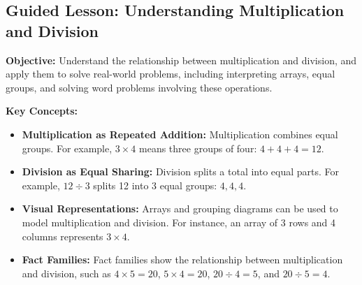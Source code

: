 \documentclass[12pt]{article}
\title{}
\date{}
\begin{document}
\subsection*{Guided Lesson: Understanding Multiplication and Division}
\onehalfspacing

\begin{tcolorbox}[colframe=black!40, colback=gray!5, 
coltitle=black, colbacktitle=black!20, fonttitle=\bfseries\Large, 
title=Learning Objective, halign title=center, left=5pt, right=5pt, top=5pt, bottom=15pt]
\textbf{Objective:} Understand the relationship between multiplication and division, and apply them to solve real-world problems, including interpreting arrays, equal groups, and solving word problems involving these operations.
\end{tcolorbox}

\vspace{1em}

\begin{tcolorbox}[colframe=black!60, colback=white, 
coltitle=black, colbacktitle=black!15, fonttitle=\bfseries\Large, 
title=Key Concepts and Vocabulary, halign title=center, left=10pt, right=10pt, top=10pt, bottom=15pt]
\textbf{Key Concepts:}
\begin{itemize}
    \item \textbf{Multiplication as Repeated Addition:} Multiplication combines equal groups. For example, \( 3 \times 4 \) means three groups of four: \( 4 + 4 + 4 = 12 \).
    \item \textbf{Division as Equal Sharing:} Division splits a total into equal parts. For example, \( 12 \div 3 \) splits 12 into 3 equal groups: \( 4, 4, 4 \).
    \item \textbf{Visual Representations:} Arrays and grouping diagrams can be used to model multiplication and division. For instance, an array of 3 rows and 4 columns represents \( 3 \times 4 \).
    \item \textbf{Fact Families:} Fact families show the relationship between multiplication and division, such as \( 4 \times 5 = 20 \), \( 5 \times 4 = 20 \), \( 20 \div 4 = 5 \), and \( 20 \div 5 = 4 \).
\end{itemize}
\end{tcolorbox}

\vspace{1em}
\end{document}
